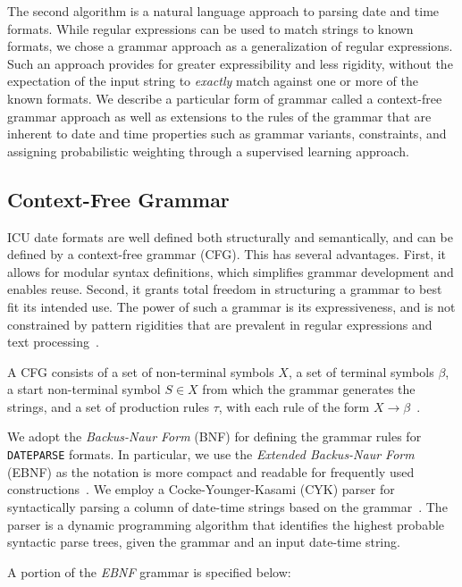 The second algorithm is a natural language approach to parsing date and time formats. While regular expressions can be used to match strings to known formats, we chose a grammar approach as a generalization of regular expressions. Such an approach provides for greater expressibility and less rigidity, without the expectation of the input string to \textit{exactly} match against one or more of the known formats. We describe a particular form of grammar called a context-free grammar approach as well as extensions to the rules of the grammar that are inherent to date and time properties such as grammar variants, constraints, and assigning probabilistic weighting through a supervised learning approach.

\subsection{Context-Free Grammar}
ICU date formats are well defined both structurally and semantically, and can be defined by a context-free grammar (CFG). This has several advantages. First, it allows for modular syntax definitions, which simplifies grammar development and enables reuse. Second, it grants total freedom in structuring a grammar to best fit its intended use. The power of such a grammar is its expressiveness, and is not constrained by pattern rigidities that are prevalent in regular expressions and text processing~\cite{Grune:1990}.


A CFG consists of a set of non-terminal symbols $X$, a set of terminal symbols $\beta$, a start non-terminal symbol $S \in X$ from which the grammar generates the strings, and a set of production rules $\tau$, with each rule of the form $X \rightarrow \beta$~\cite{Hopcroft:1990}. 

We adopt the \textit{Backus-Naur Form} (BNF) for defining the grammar rules for \texttt{DATEPARSE} formats. In particular, we use the \textit{Extended Backus-Naur Form} (EBNF) as the notation is more compact and readable for frequently used constructions~\cite{Grune:1990}. We employ a Cocke-Younger-Kasami (CYK) parser for syntactically parsing a column of date-time strings based on the grammar~\cite{Cocke:1969,Younger67,Kasami:1965}. The parser is a dynamic programming algorithm that identifies the highest probable syntactic parse trees, given the grammar and an input date-time string.


A portion of the \textit{EBNF} grammar is specified below:

